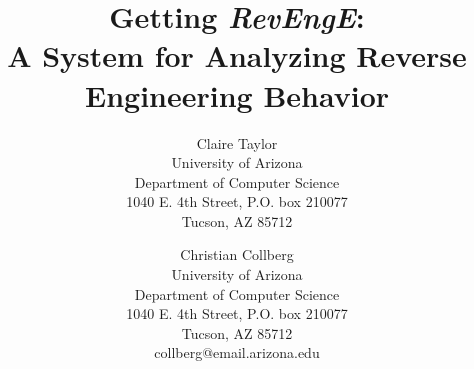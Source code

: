 \documentclass[times, 10pt,twocolumn]{article}
\newcommand{\revenge}{{\em RevEngE}\xspace}
\begin{document}
\title{Getting \revenge:\protect\\A System for Analyzing Reverse Engineering Behavior}

\author{Claire Taylor\\
University of Arizona\\ Department of Computer Science \\ 1040 E. 4th Street, P.O. box 210077 \\ Tucson, AZ 85712 \\
\and
Christian Collberg\\
University of Arizona\\ Department of Computer Science \\ 1040 E. 4th Street, P.O. box 210077 \\ Tucson, AZ 85712 \\ collberg@email.arizona.edu \\
}

\maketitle
\thispagestyle{empty}





%








\end{document}

